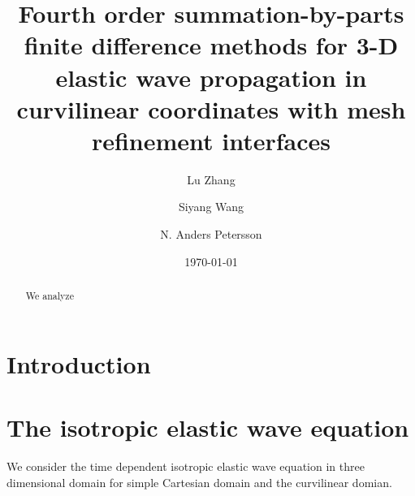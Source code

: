 \documentclass[a4paper]{article}
\title{Fourth order summation-by-parts finite difference methods for  3-D elastic wave propagation in curvilinear coordinates with mesh refinement interfaces}
\date{\today}
\author{ Lu Zhang \and Siyang Wang \and N. Anders Petersson}
\begin{document}
\maketitle

\begin{abstract}
We analyze
\end{abstract}

\section{Introduction}

\section{The isotropic elastic wave equation }
We consider the time dependent isotropic elastic wave equation in three dimensional domain for simple Cartesian domain and the curvilinear domian.
\end{document}
